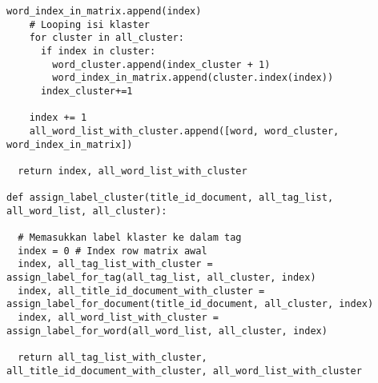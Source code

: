 \begin{lstlisting}[breaklines=true]
    word_index_in_matrix.append(index)
    # Looping isi klaster
    for cluster in all_cluster:
      if index in cluster:
        word_cluster.append(index_cluster + 1)
        word_index_in_matrix.append(cluster.index(index))
      index_cluster+=1

    index += 1
    all_word_list_with_cluster.append([word, word_cluster, word_index_in_matrix])
  
  return index, all_word_list_with_cluster

def assign_label_cluster(title_id_document, all_tag_list, all_word_list, all_cluster): 
  
  # Memasukkan label klaster ke dalam tag
  index = 0 # Index row matrix awal
  index, all_tag_list_with_cluster = assign_label_for_tag(all_tag_list, all_cluster, index)
  index, all_title_id_document_with_cluster = assign_label_for_document(title_id_document, all_cluster, index)
  index, all_word_list_with_cluster = assign_label_for_word(all_word_list, all_cluster, index)

  return all_tag_list_with_cluster, all_title_id_document_with_cluster, all_word_list_with_cluster
\end{lstlisting}

